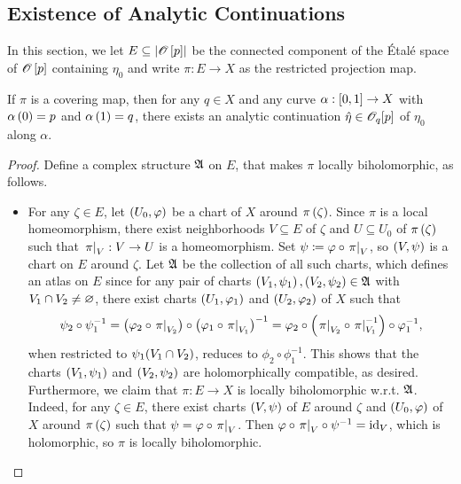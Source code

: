 \documentclass[../Moduli_Spaces_of_Riemann_Surfaces.tex]{subfiles}
\begin{document}
    \subsection{Existence of Analytic Continuations}
    In this section, we let $E\subseteq\l|\HOLO\l[p\r]\r|$ be the connected component of the Étalé space of $\HOLO\l[p\r]$ containing $\eta_0$ and write $\pi:E\to X$ as the restricted projection map.
    \begin{theorem}\label{2.3:thm:existence_of_analytic_continuation}
        If $\pi$ is a covering map, then for any $q\in X$ and any curve $\alpha:\l[0,1\r]\to X$ with $\alpha\l(0\r)=p$ and $\alpha\l(1\r)=q$, there exists an analytic continuation $\hat{\eta}\in\HOLO_q\!\l[p\r]$ of $\eta_0$ along $\alpha$.
    \end{theorem}
    \begin{proof}
        Define a complex structure $\mf{A}$ on $E$, that makes $\pi$ locally biholomorphic, as follows.
        \begin{itemize}
            \item For any $\zeta\in E$, let $\tpl{U_0,\phi}$ be a chart of $X$ around $\pi\l(\zeta\r)$. Since $\pi$ is a local homeomorphism, there exist neighborhoods $V\subseteq E$ of $\zeta$ and $U\subseteq U_0$ of $\pi\l(\zeta\r)$ such that $\l.\pi\r|_V:V\to U$ is a homeomorphism. Set $\psi\coloneqq\phi\circ\l.\pi\r|_V$, so $\tpl{V,\psi}$ is a chart on $E$ around $\zeta$. Let $\mf{A}$ be the collection of all such charts, which defines an atlas on $E$ since for any pair of charts $\tpl{V_1,\psi_1},\tpl{V_2,\psi_2}\in\mf{A}$ with $V_1\cap V_2\neq\em$, there exist charts $\tpl{U_1,\phi_1}$ and $\tpl{U_2,\phi_2}$ of $X$ such that
                \begin{equation*}
                    \psi_2\circ\psi_1^{-1}=\l(\phi_2\circ\l.\pi\r|_{V_2}\r)\circ\l(\phi_1\circ\l.\pi\r|_{V_1}\r)^{-1}=\phi_2\circ\l(\l.\pi\r|_{V_2}\circ\l.\pi\r|_{V_1}^{-1}\r)\circ\phi_1^{-1},
                \end{equation*}
                when restricted to $\psi_1\!\l(V_1\cap V_2\r)$, reduces to $\phi_2\circ\phi_1^{-1}$. This shows that the charts $\tpl{V_1,\psi_1}$ and $\tpl{V_2,\psi_2}$ are holomorphically compatible, as desired. Furthermore, we claim that $\pi:E\to X$ is locally biholomorphic w.r.t. $\mf{A}$. Indeed, for any $\zeta\in E$, there exist charts $\tpl{V,\psi}$ of $E$ around $\zeta$ and $\tpl{U_0,\phi}$ of $X$ around $\pi\l(\zeta\r)$ such that $\psi=\phi\circ\l.\pi\r|_V$. Then $\phi\circ\l.\pi\r|_V\circ\psi^{-1}=\id_V$, which is holomorphic, so $\pi$ is locally biholomorphic.

\end{itemize}
\end{proof}
\end{document}
